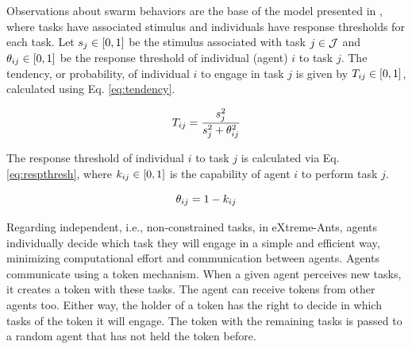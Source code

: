 Observations about swarm behaviors are the base of the model presented in \citep{Theraulaz+1998}, where tasks have associated stimulus %
and individuals have response thresholds for each task. Let $s_j \in [0,1]$ be the stimulus associated with task $j \in \mathcal{J}$ and $\theta_{ij} \in [0,1]$ be the response threshold of individual (agent) $i$ to task $j$. The tendency, or probability, of individual $i$ to engage in task $j$ is given by $T_{ij} \in [0,1]$, calculated using Eq. \ref{eq:tendency}.

\begin{equation}
\label{eq:tendency}
T_{ij} = \frac{s_j^2}{s_j^2 + \theta_{ij}^2}
\end{equation}

The response threshold  of individual $i$ to task $j$ is calculated via Eq. \ref{eq:respthresh}, where $k_{ij} \in [0,1]$ is the capability of agent $i$ to perform task $j$.

\begin{equation}
\label{eq:respthresh}
\theta_{ij} = 1 - k_{ij}
\end{equation}

Regarding independent, i.e., non-constrained tasks, in eXtreme-Ants, agents individually decide which task they will engage in a simple and efficient way, minimizing computational effort and communication between agents. Agents communicate using a token mechanism. When a given agent perceives new tasks, it creates a token with these tasks. The agent can receive tokens from other agents too. Either way, the holder of a token has the right to decide in which tasks of the token it will engage. The token with the remaining tasks is passed to a random agent that has not held the token before. %

%
%

